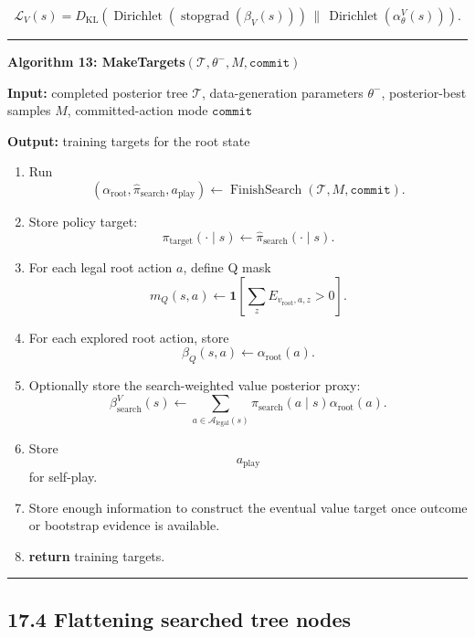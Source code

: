 \documentclass[11pt]{article}
\newcommand{\one}{\mathbf{1}}
\newcommand{\Dir}{\operatorname{Dirichlet}}
\newcommand{\stopgrad}{\operatorname{stopgrad}}
\newcommand{\Tree}{\mathcal{T}}
\newcommand{\Legal}{\mathcal{A}_{\mathrm{legal}}}
\newcommand{\FinishSearch}{\operatorname{FinishSearch}}
\newenvironment{algorithmblock}[1]
{
  \par\medskip
  \noindent\hrule\par\smallskip
  \noindent\textbf{#1}
  \par\smallskip
}
{
  \par\smallskip\noindent\hrule\par\medskip
}
\newcommand{\Input}{\textbf{Input: }}
\newcommand{\Output}{\textbf{Output: }}
\newcommand{\Return}{\textbf{return }}
\begin{document}
\[
\mathcal{L}_V(s)
=
D_{\mathrm{KL}}
\left(
\Dir
\left(
\stopgrad(\beta_V(s))
\right)
\,\|\,
\Dir
\left(
\alpha_\theta^V(s)
\right)
\right).
\]

\begin{algorithmblock}{Algorithm 13: MakeTargets\((\Tree,\theta^-,M,\texttt{commit})\)}

\Input completed posterior tree \(\Tree\), data-generation parameters \(\theta^-\), posterior-best samples \(M\), committed-action mode \(\texttt{commit}\)

\Output training targets for the root state

\begin{enumerate}[leftmargin=2em]
  \item Run
  \[
  \left(
  \alpha_{\mathrm{root}},
  \hat{\pi}_{\mathrm{search}},
  a_{\mathrm{play}}
  \right)
  \gets
  \FinishSearch(\Tree,M,\texttt{commit}).
  \]

  \item Store policy target:
  \[
  \pi_{\mathrm{target}}(\cdot\mid s)
  \gets
  \hat{\pi}_{\mathrm{search}}(\cdot\mid s).
  \]

  \item For each legal root action \(a\), define Q mask
  \[
  m_Q(s,a)
  \gets
  \one
  \left[
  \sum_z E_{v_{\mathrm{root}},a,z} > 0
  \right].
  \]

  \item For each explored root action, store
  \[
  \beta_Q(s,a)
  \gets
  \alpha_{\mathrm{root}}(a).
  \]

  \item Optionally store the search-weighted value posterior proxy:
  \[
  \beta_{\mathrm{search}}^V(s)
  \gets
  \sum_{a\in\Legal(s)}
  \hat\pi_{\mathrm{search}}(a\mid s)
  \alpha_{\mathrm{root}}(a).
  \]

  \item Store
  \[
  a_{\mathrm{play}}
  \]
  for self-play.

  \item Store enough information to construct the eventual value target once
  outcome or bootstrap evidence is available.

  \item \Return training targets.
\end{enumerate}

\end{algorithmblock}

\subsection*{17.4 Flattening searched tree nodes}
\end{document}

